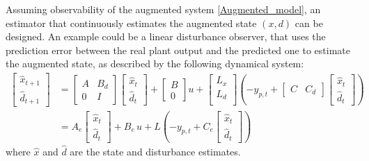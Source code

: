 \documentclass[a4paper,12pt,oneside]{book}
\begin{document}
\bigskip
Assuming observability of the augmented system \ref{Augmented_model}, an estimator that continuously estimates the augmented state $(x,d)$ can be designed.
An example could be a linear disturbance observer, that uses the prediction error between the real plant output and the predicted one to estimate the augmented state, as described by the following dynamical system:
\begin{equation}
    \begin{aligned}
    	\begin{bmatrix}
    	   \hat{x}_{t+1} \\
            \hat{d}_{t+1}
        \end{bmatrix}
        &= 
    	\begin{bmatrix}
    		A & B_d \\
    		0 & I
    	\end{bmatrix}
    	\begin{bmatrix}
    		\hat{x}_t \\
    		\hat{d}_t
    	\end{bmatrix}
        +
    	\begin{bmatrix}
    		B \\
    		0
    	\end{bmatrix}
        u +
        \begin{bmatrix}
            L_x \\
            L_d \\
        \end{bmatrix} 
        ( - y_{p,t} +
        \begin{bmatrix}
            C & C_d 
        \end{bmatrix}
        \begin{bmatrix}
            \hat{x}_t \\
            \hat{d}_t
        \end{bmatrix} ) \\
        & = A_e 
        \begin{bmatrix}
        \hat{x}_t \\
        \hat{d}_t
    	\end{bmatrix}
        + 
        B_e \, u +
        L (
         - y_{p,t} +
        C_e
        \begin{bmatrix}
            \hat{x}_t \\
            \hat{d}_t
        \end{bmatrix} )
    \end{aligned}
\label{eq:Estimator_and_observer}
\end{equation}
where $\hat{x}$ and $\hat{d}$ are the state and disturbance estimates.
\end{document}
